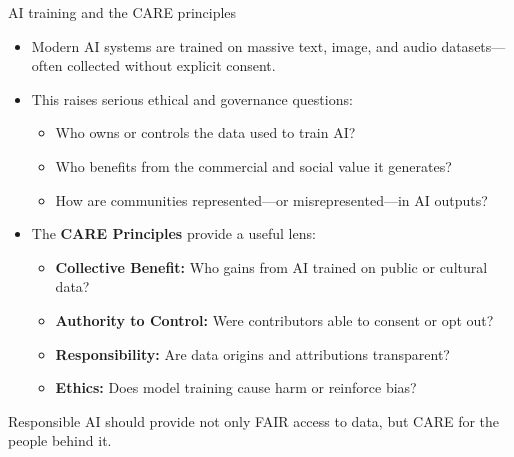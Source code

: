 \documentclass[aspectratio=169]{beamer}
\begin{document}
\begin{frame}{AI training and the CARE principles}
\begin{itemize}
  \item Modern AI systems are trained on massive text, image, and audio datasets—often collected without explicit consent.  
  \item This raises serious ethical and governance questions:  
    \begin{itemize}
      \item Who owns or controls the data used to train AI?  
      \item Who benefits from the commercial and social value it generates?  
      \item How are communities represented—or misrepresented—in AI outputs?
    \end{itemize}
  \item The \textbf{CARE Principles} provide a useful lens:  
    \begin{itemize}
      \item \textbf{Collective Benefit:} Who gains from AI trained on public or cultural data?  
      \item \textbf{Authority to Control:} Were contributors able to consent or opt out?  
      \item \textbf{Responsibility:} Are data origins and attributions transparent?  
      \item \textbf{Ethics:} Does model training cause harm or reinforce bias?
    \end{itemize}
\end{itemize}
\medskip
Responsible AI should provide not only FAIR access to data, but CARE for the people behind it.
\end{frame}
\end{document}
